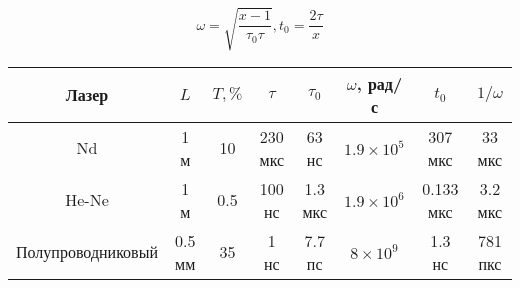 \documentclass[a4paper, 12pt]{article}
\begin{document}
\begin{enumerate}
\begin{equation*}
			\end{equation*}
			\begin{equation*}
				\omega=\sqrt{\frac{x-1}{\tau_0\tau}}, t_0=\frac{2\tau}{x}
			\end{equation*}
			\begin{table}[h]
				\centering
				\begin{tabular}{|c|c|c|c|c|c|c|c|}
					\hline
					Лазер & $L$ & $T,\%$ & $\tau$ & $\tau_0$ & $\omega$, рад/с & $t_0$ & $1/\omega$\\
					\hline
					Nd & 1 м & 10 & 230 мкс & 63 нс & $1.9\times 10^5$ & 307 мкс & 33 мкс\\
					He-Ne & 1 м & 0.5 & 100 нс & 1.3 мкс & $1.9\times 10^{6}$ & 0.133 мкс & 3.2 мкс\\
					Полупроводниковый & 0.5 мм & 35 & 1 нс & 7.7 пс & $8\times 10^9$ & 1.3 нс & 781 пкс\\
					\hline
				\end{tabular}
			\end{table}
	\end{enumerate}
\end{document}
